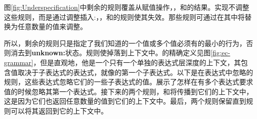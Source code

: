 图\ref{fig:Underspecification}中剩余的规则覆盖从赋值操作，，和的结果。实现不调整这些规则，而是通过调整插入:，，和的规则使其失效。那些规则可通过在其中将替换为任意数量的值来调整。

所以，剩余的规则只是指定了我们知道的一个值或多个值必须有的最小的行为，否则消去到\textbf{unknown:}状态。规则使掉落到上下文中。的精确定义见图\ref{fig:ec-grammar}，但是直观地，他是一个只有一个单独的表达式层深度的上下文，其包含值取决于子表达式的表达式，就像的第一个子表达式。以下是在表达式中忽略的规则，这些表达式忽略它们的一些子表达式的值。展示了怎样在有多个表达式要求值的时候忽略其第一个表达式。接下来的两个规则，和将传播到它们的上下文中，这是因为它们也返回任意数量的值到它们的上下文中。最后，两个规则保留直到规则可以将其返回到它的上下文中。


